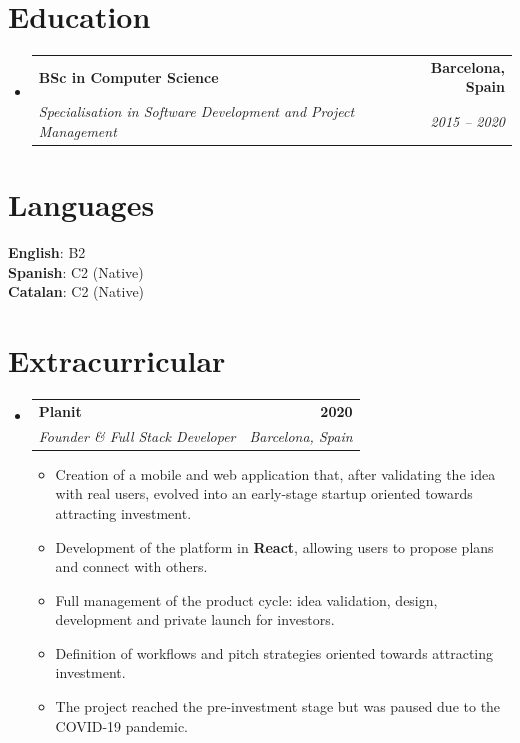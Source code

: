 \documentclass[letterpaper,11pt]{article}
\makeatletter
\newcommand{\resumeItem}[1]{
  \item\small{
    {#1 \vspace{-2pt}}
  }
}
\newcommand{\resumeSubheading}[4]{
  \vspace{-2pt}\item
    \begin{tabular*}{1.0\textwidth}[t]{l@{\extracolsep{\fill}}r}
      \textbf{#1} & \textbf{\small #2} \\
      \textit{\small#3} & \textit{\small #4} \\
    \end{tabular*}\vspace{-7pt}
}
\newcommand{\resumeSubHeadingListStart}{\begin{itemize}[leftmargin=0.0in, label={}]}
\newcommand{\resumeSubHeadingListEnd}{\end{itemize}}
\newcommand{\resumeItemListStart}{\begin{itemize}}
\newcommand{\resumeItemListEnd}{\end{itemize}\vspace{-5pt}}
\makeatother
\begin{document}
\section{Education}
  \resumeSubHeadingListStart
    \resumeSubheading
      {BSc in Computer Science}{Barcelona, Spain}
      {Specialisation in Software Development and Project Management}{2015 -- 2020}
  \resumeSubHeadingListEnd
 \vspace{8pt}



\section{Languages}
     \textbf{English}{: B2} \\
     \textbf{Spanish}{: C2 (Native)} \\
     \textbf{Catalan}{: C2 (Native)} \\
 \vspace{8pt}



\section{Extracurricular}
    \resumeSubHeadingListStart
        \resumeSubheading{Planit}{2020}{Founder \& Full Stack Developer}{Barcelona, Spain}
            \resumeItemListStart
                \resumeItem{Creation of a mobile and web application that, after validating the idea with real users, evolved into an early-stage startup oriented towards attracting investment.}
                \resumeItem{Development of the platform in \textbf{React}, allowing users to propose plans and connect with others.}
                \resumeItem{Full management of the product cycle: idea validation, design, development and private launch for investors.}
                \resumeItem{Definition of workflows and pitch strategies oriented towards attracting investment.}
                \resumeItem{The project reached the pre-investment stage but was paused due to the COVID-19 pandemic.}
            \resumeItemListEnd
    \resumeSubHeadingListEnd
\end{document}
